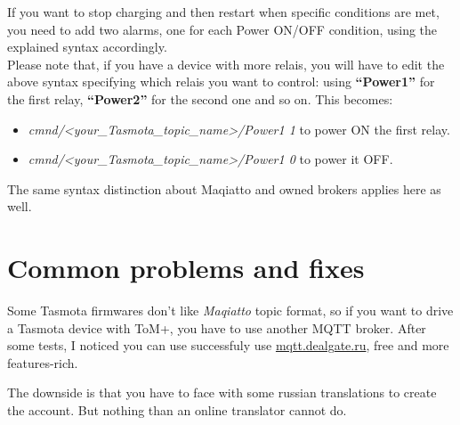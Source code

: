 If you want to stop charging and then restart when specific conditions are met, you
need to add two alarms, one for each Power ON/OFF condition, using the explained syntax accordingly.\\

Please note that, if you have a device with more relais, you will have to 
edit the above syntax specifying which relais you want to control: using \textbf{“Power1”}
for the first relay, \textbf{“Power2”} for the second one and so on. This becomes:
\begin{itemize} 
    \item \textit{cmnd/<your\_Tasmota\_topic\_name>/Power1 1} to power ON the first relay.
    \item \textit{cmnd/<your\_Tasmota\_topic\_name>/Power1 0} to power it OFF.
\end{itemize}
The same syntax distinction about Maqiatto and owned brokers applies here as well.

\section{Common problems and fixes}

Some Tasmota firmwares don't like \textit{Maqiatto} topic format, so if you want to 
drive a Tasmota device with ToM+, you have to use another MQTT broker.
After some tests, I noticed you can use successfuly use \href{https://dealgate.ru/}{mqtt.dealgate.ru},
free and more features-rich. 

The downside is that you have to face with some russian translations to create the account.
But nothing than an online translator cannot do.